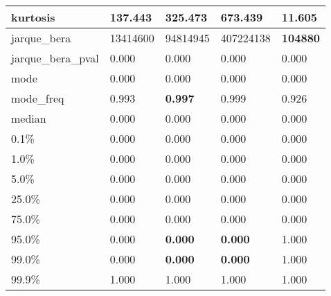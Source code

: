 \begin{table}[H]
\begin{tabular}{|l|m{10em}|m{10em}|m{10em}|m{10em}|}
\hline kurtosis & 137.443 & 325.473 & \cellcolor[rgb]{0.9, 0.54, 0.52} 673.439 & \bfseries 11.605 \\
\hline jarque\_bera & 13414600 & 94814945 & \cellcolor[rgb]{0.9, 0.54, 0.52} 407224138 & \bfseries 104880 \\
\hline jarque\_bera\_pval & 0.000 & 0.000 & 0.000 & 0.000 \\
\hline mode & 0.000 & 0.000 & 0.000 & 0.000 \\
\hline mode\_freq & 0.993 & \bfseries 0.997 & 0.999 & \cellcolor[rgb]{0.9, 0.54, 0.52} 0.926 \\
\hline median & 0.000 & 0.000 & 0.000 & 0.000 \\
\hline 0.1\% & 0.000 & 0.000 & 0.000 & 0.000 \\
\hline 1.0\% & 0.000 & 0.000 & 0.000 & 0.000 \\
\hline 5.0\% & 0.000 & 0.000 & 0.000 & 0.000 \\
\hline 25.0\% & 0.000 & 0.000 & 0.000 & 0.000 \\
\hline 75.0\% & 0.000 & 0.000 & 0.000 & 0.000 \\
\hline 95.0\% & 0.000 & \bfseries 0.000 & \bfseries 0.000 & \cellcolor[rgb]{0.9, 0.54, 0.52} 1.000 \\
\hline 99.0\% & 0.000 & \bfseries 0.000 & \bfseries 0.000 & \cellcolor[rgb]{0.9, 0.54, 0.52} 1.000 \\
\hline 99.9\% & 1.000 & 1.000 & 1.000 & 1.000 \\
\hline
\end{tabular}
\end{table}
